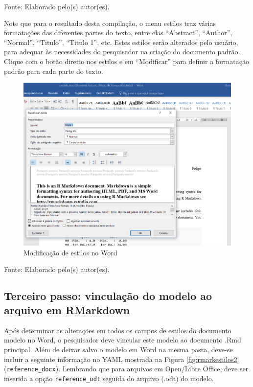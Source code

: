 \documentclass[12pt,portuguese,oneside]{book}
\begin{document}
Fonte: Elaborado pelo(s) autor(es).

Note que para o resultado desta compilação, o menu estilos traz várias
formatações das diferentes partes do texto, entre elas ``Abstract'',
``Author'', ``Normal'', ``Titulo'', ``Titulo 1'', etc. Estes estilos
serão alterados pelo usuário, para adequar às necessidades do
pesquisador na criação do documento padrão. Clique com o botão direito
nos estilos e em ``Modificar'' para definir a formatação padrão para
cada parte do texto.

\begin{figure}[H]

{\centering \includegraphics[width=0.8\linewidth]{rmarkestilos1} 

}

\caption{Modificação de estilos no Word}\label{fig:rmarkestilos1}
\end{figure}

Fonte: Elaborado pelo(s) autor(es).

\subsection{Terceiro passo: vinculação do modelo ao arquivo em
RMarkdown}\label{terceiro-passo-vinculacao-do-modelo-ao-arquivo-em-rmarkdown}

Após determinar as alterações em todos os campos de estilos do documento
modelo no Word, o pesquisador deve vincular este modelo ao documento
.Rmd principal. Além de deixar salvo o modelo em Word na mesma pasta,
deve-se incluir a seguinte informação no YAML mostrada na Figura
\ref{fig:rmarkestilos2} (\texttt{reference\_docx}). Lembrando que para
arquivos em Open/Libre Office, deve ser inserida a opção
\texttt{reference\_odt} seguida do arquivo (.odt) do modelo.
\end{document}
